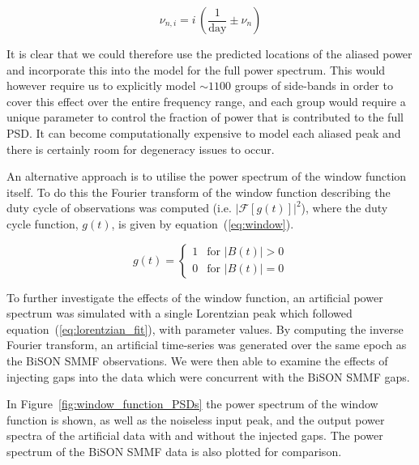 \begin{equation}
\nu_{n, i} = i \, (\frac{1}{\mathrm{day}} \pm \nu_{n})
\label{eq:sidebands}
\end{equation}

It is clear that we could therefore use the predicted locations of the aliased power and incorporate this into the model for the full power spectrum. This would however require us to explicitly model $\sim 1100$ groups of side-bands in order to cover this effect over the entire frequency range, and each group would require a unique parameter to control the fraction of power that is contributed to the full PSD. It can become computationally expensive to model each aliased peak and there is certainly room for degeneracy issues to occur.

An alternative approach is to utilise the power spectrum of the window function itself. To do this the Fourier transform of the window function describing the duty cycle of observations was computed (i.e. $\left|\mathcal{F}\left[g(t)\right]\right|^2$), where the duty cycle function, $g(t)$, is given by equation~(\ref{eq:window}).

\begin{equation}
g(t) = 
\begin{cases} 
1 & \text{for } |B(t)| > 0 \\
0       & \text{for } |B(t)| = 0
\end{cases}
\label{eq:window}
\end{equation}

To further investigate the effects of the window function, an artificial power spectrum was simulated with a single Lorentzian peak which followed equation~(\ref{eq:lorentzian_fit}), with parameter values. By computing the inverse Fourier transform, an artificial time-series was generated over the same epoch as the BiSON SMMF observations. We were then able to examine the effects of injecting gaps into the data which were concurrent with the BiSON SMMF gaps. 

In Figure~\ref{fig:window_function_PSDs} the power spectrum of the window function is shown, as well as the noiseless input peak, and the output power spectra of the artificial data with and without the injected gaps. The power spectrum of the BiSON SMMF data is also plotted for comparison.

